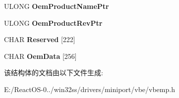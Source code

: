 \begin{DoxyCompactItemize}
U\+L\+O\+NG {\bfseries Oem\+Product\+Name\+Ptr}
\item 
\mbox{\label{struct_v_b_e___i_n_f_o_aa993c4b7faae774a6b33efc867744842}} 
U\+L\+O\+NG {\bfseries Oem\+Product\+Rev\+Ptr}
\item 
\mbox{\label{struct_v_b_e___i_n_f_o_a08f0d63509a2db0fa8c7141e53334078}} 
C\+H\+AR {\bfseries Reserved} \mbox{[}222\mbox{]}
\item 
\mbox{\label{struct_v_b_e___i_n_f_o_aaf5b9845d484d0c692f64662ecfacc68}} 
C\+H\+AR {\bfseries Oem\+Data} \mbox{[}256\mbox{]}
\end{DoxyCompactItemize}


该结构体的文档由以下文件生成\+:\begin{DoxyCompactItemize}
\item 
E\+:/\+React\+O\+S-\/0../win32ss/drivers/miniport/vbe/vbemp.\+h\end{DoxyCompactItemize}
